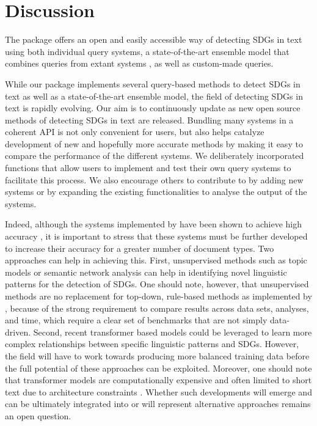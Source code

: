 \section{Discussion}
 The  package offers an open and easily accessible way of detecting SDGs in text using both individual query systems, a state-of-the-art ensemble model that combines queries from extant systems \citep{wulff2023using}, as well as custom-made queries. 
 
 While our package implements several query-based methods to detect SDGs in text as well as a state-of-the-art ensemble model, the field of detecting SDGs in text is rapidly evolving. Our aim is to continuously update  as new open source methods of detecting SDGs in text are released. Bundling many systems in a coherent API is not only convenient for users, but also helps catalyze development of new and hopefully more accurate methods by making it easy to compare the performance of the different systems. We deliberately incorporated functions that allow users to implement and test their own query systems to facilitate this process. We also encourage others to contribute to  by adding new systems or by expanding the existing functionalities to analyse the output of the systems. 

Indeed, although the systems implemented by  have been shown to achieve high accuracy \citep{wulff2023using}, it is important to stress that these systems must be further developed to increase their accuracy for a greater number of document types. Two approaches can help in achieving this. First, unsupervised methods such as topic models \citep{grun2011topicmodels} or semantic network analysis \citep{siew2019cognitive} can help in identifying novel linguistic patterns for the detection of SDGs. One should note, however, that unsupervised methods are no replacement for top-down, rule-based methods as implemented by , because of the strong requirement to compare results across data sets, analyses, and time, which require a clear set of benchmarks that are not simply data-driven. Second, recent transformer based models \citep{reimers2019sentence} could be leveraged to learn more complex relationships between specific linguistic patterns and SDGs. However, the field will have to work towards producing more balanced training data before the full potential of these approaches can be exploited. Moreover, one should note that transformer models are computationally expensive and often limited to short text due to architecture constraints \citep{ding2020cogltx}. Whether such developments will emerge and can be ultimately integrated into  or will represent alternative approaches remains an open question. 
 

